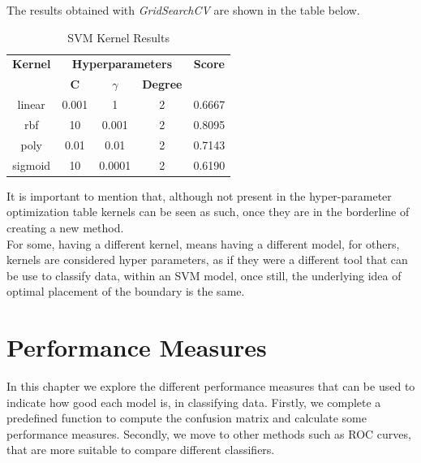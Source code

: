 \documentclass{thesisreport}
\begin{document}
The results obtained with \textit{GridSearchCV} are shown in the table below.

\begin{table}[H]
\centering
\begin{tabular}{|c|ccc|c|}
\hline
\textbf{Kernel} & \multicolumn{3}{c|}{\textbf{Hyperparameters}} & \textbf{Score} \\
\cline{2-4}
 & \textbf{C} & \textbf{$\gamma$} & \textbf{Degree} & \\

\hline
linear & 0.001 & 1 & 2 & 0.6667 \\
\hline
rbf & 10 & 0.001 & 2 & 0.8095 \\
\hline
poly & 0.01 & 0.01 & 2 & 0.7143 \\
\hline
sigmoid & 10 & 0.0001 & 2 & 0.6190 \\
\hline
\end{tabular}
\caption{SVM Kernel Results}
\label{tab:svm-kernel-results}
\end{table}


It is important to mention that, although not present in the hyper-parameter optimization table kernels can be seen as such, once they are in the borderline of creating a new method.\\
For some, having a  different kernel, means having a different model, for others, kernels are considered hyper parameters, as if they were a different tool that can be use to classify data, within an SVM model, once still, the underlying idea of optimal placement of the boundary is the same.
\newpage

\chapter{Performance Measures}
In this chapter we explore the different performance measures that can be used to indicate how good each model is, in classifying data. Firstly, we complete a predefined function to compute the confusion matrix and calculate some performance measures. Secondly, we move to other methods such as ROC curves, that are more suitable to compare different classifiers.
\end{document}
